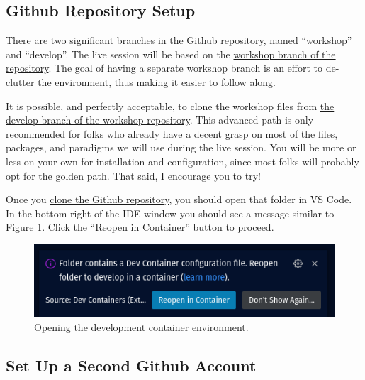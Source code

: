 \subsection{\label{sec:repo}Github Repository Setup}

\justifying
There are two significant branches in the Github repository, named ``workshop'' and ``develop''. The live session will be based on the \href{https://github.com/devsecfranklin/workshop-codemash-2023/tree/workshop}{workshop branch of the repository}. The goal of having a
separate workshop branch is an effort to de-clutter the environment, thus making it easier to follow along.
\vspace{2mm}

\justifying
It is possible, and perfectly acceptable, to clone the workshop files from \href{https://github.com/devsecfranklin/workshop-codemash-2023/tree/develop}{the develop branch of the workshop repository}. This 
advanced path is only recommended for folks who already have a  decent grasp on most of the files, packages, and paradigms we will
use during the live session. You will be more or less on your own for installation and configuration, since most folks will probably
opt for the golden path. That said, I encourage you to try!
\vspace{2mm}

\justifying
Once you \href{https://github.com/devsecfranklin/workshop-codemash-2023/tree/workshop}{clone the Github repository}, you should open that folder in VS Code. In the bottom right of the IDE window you should see a message similar to Figure \ref{dev-container}. Click the ``Reopen in Container'' button to proceed.

\begin{figure}[ht]
	\includegraphics[width=12cm]{images/dev-container1.png}
	\caption{Opening the development container environment.}
	\label{dev-container}
\end{figure}
\vspace{2mm}

\subsection{\label{sec:acct}Set Up a Second Github Account}

